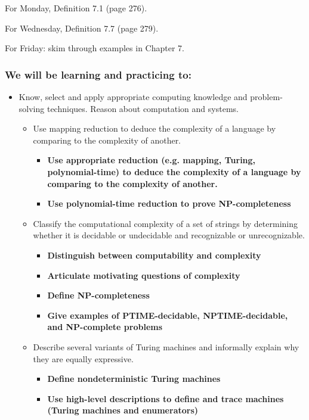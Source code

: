 For Monday, Definition 7.1 (page 276).

For Wednesday, Definition 7.7 (page 279).

For Friday:  skim through examples in Chapter 7.
\vspace{-20pt}

\subsubsection*{We will be learning and practicing to:}

\vspace{-20pt}

\begin{itemize}
    \item Know, select and apply appropriate computing knowledge and problem-solving techniques. Reason about computation and systems.
    \begin{itemize}
        \item Use mapping reduction to deduce the complexity of a language by comparing to the complexity of another.
        \begin{itemize}
         \item {\bf Use appropriate reduction (e.g. mapping, Turing, polynomial-time) to deduce the complexity of a language by comparing to the complexity of another.}
         \item {\bf Use polynomial-time reduction to prove NP-completeness}
       \end{itemize}
    \item Classify the computational complexity of a set of strings by determining whether it is decidable or undecidable and recognizable or unrecognizable.
    \begin{itemize}
        \item {\bf Distinguish between computability and complexity}
        \item {\bf Articulate motivating questions of complexity}
        \item {\bf Define NP-completeness}
        \item {\bf Give examples of PTIME-decidable, NPTIME-decidable, and NP-complete problems}
    \end{itemize}
   \item  Describe several variants of Turing machines and informally explain why they are equally expressive.
   \begin{itemize}
   \item {\bf Define nondeterministic Turing machines}
   \item {\bf Use high-level descriptions to define and trace machines (Turing machines and enumerators)}
   \end{itemize}
\end{itemize}
\end{itemize}

